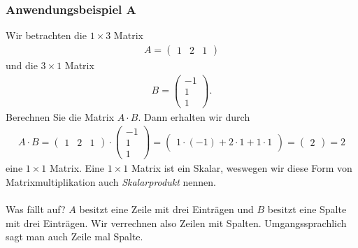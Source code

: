 \subsubsection*{Anwendungsbeispiel A}

Wir betrachten die $1 \times 3$ Matrix
\begin{align*}
A=
\begin{pmatrix}
1 &  2  & 1
\end{pmatrix}
\end{align*}
und die $3 \times 1$ Matrix
\begin{align*}
B=
\begin{pmatrix}
-1\\ 1\\  1
\end{pmatrix}.
\end{align*}
Berechnen Sie die Matrix $A \cdot B$.
Dann erhalten wir durch 
\begin{align*}
A \cdot B =
\begin{pmatrix}
1 & 2 &  1
\end{pmatrix}
\cdot
\begin{pmatrix}
-1\\ 1\\  1
\end{pmatrix}
=
\begin{pmatrix}
1 \cdot (-1) + 2 \cdot 1 + 1 \cdot 1
\end{pmatrix}
=
\begin{pmatrix}
2
\end{pmatrix}
= 2
\end{align*}
eine $1 \times 1$ Matrix.
Eine $1 \times 1$ Matrix ist ein Skalar, weswegen wir diese Form von Matrixmultiplikation auch 
\textit{Skalarprodukt} nennen.\\
\\
Was fällt auf?
$A$ besitzt eine Zeile mit drei Einträgen und $B$ besitzt eine Spalte mit drei Einträgen.
Wir verrechnen also Zeilen mit Spalten.
Umgangssprachlich sagt man auch \glqq Zeile mal Spalte\grqq.

